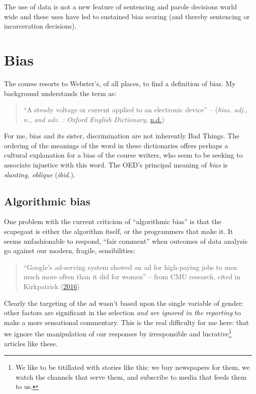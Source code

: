 \documentclass[
]{book}
\begin{document}
The use of data is not a new feature of sentencing and parole decisions world wide and these uses have led to sustained bias scoring (and thereby sentencing or incarceration decisions).

\hypertarget{bias}{%
\section{Bias}\label{bias}}

The course resorts to Webster's, of all places, to find a definition of bias. My background understands the term as:

\begin{quote}
``A steady voltage or current applied to an electronic device'' -- (\emph{bias, adj., n., and adv. : Oxford English Dictionary}, \protect\hyperlink{ref-OED-bias}{n.d.})
\end{quote}

For me, bias and its sister, discrimination are not inherently Bad Things. The ordering of the meanings of the word in these dictionaries offers perhaps a cultural explanation for a bias of the course writers, who seem to be seeking to associate injustice with this word. The OED's principal meaning of \emph{bias} is \emph{slanting, oblique} (\emph{ibid.}).

\hypertarget{algorithmic-bias}{%
\subsection{Algorithmic bias}\label{algorithmic-bias}}

One problem with the current criticism of ``algorithmic bias'' is that the scapegoat is either the algorithm itself, or the programmers that make it. It seems unfashionable to respond, ``fair comment'' when outcomes of data analysis go against our modern, fragile, sensibilities:

\begin{quote}
``Google's ad-serving system showed an ad for high-paying jobs to men much more often than it did for women'' -- from CMU research, cited in Kirkpatrick (\protect\hyperlink{ref-Kirkpatrick2016}{2016})
\end{quote}

Clearly the targeting of the ad wasn't based upon the single variable of gender: other factors are significant in the selection \emph{and are ignored in the reporting} to make a more sensational commentary. This is the real difficulty for me here: that we ignore the manipulation of our responses by irresponsible and lucrative\footnote{We like to be titillated with stories like this: we buy newspapers for them, we watch the channels that serve them, and subscribe to media that feeds them to us.} articles like these.
\end{document}
